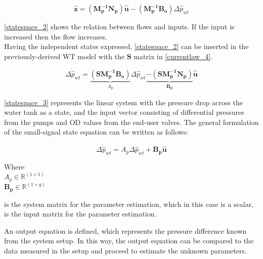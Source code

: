 \begin{equation}
 \bm{\hat{z}} = (\bm{M_p^{-1}}\bm{N_p})\bm{\hat{u}} - (\bm{M_p^{-1}}\bm{B_o})\Delta \hat{p}_{wt}    
 \label{statespace_2}
\end{equation}

\eqref{statespace_2} shows the relation between flows and inputs. If the input is increased then the flow increases. 
\\
Having the independent states expressed, \eqref{statespace_2} can be inserted in the previously-derived WT model with the $\bm{S}$ matrix in \eqref{currentlaw_4}. 

\begin{equation}
\Delta \dot{\hat{p}}_{wt} =  \underbrace{(\bm{S}\bm{M_p^{-1}}\bm{B_o})}_\text{$A_p$} \Delta \hat{p}_{wt}   \underbrace{-(\bm{S}\bm{M_p^{-1}}\bm{N_p})}_\text{$\bm{B_p}$} \bm{\hat{u}} 
\label{statespace_3}
\end{equation}

\eqref{statespace_3} represents the linear system with the pressure drop across the water tank as a state, and the input vector consisting of differential pressures from the pumps and OD values from the end-user valves. The general formulation of the small-signal state equation can be written as follows:  

\begin{equation}
\Delta \dot{\hat{p}}_{wt} =  A_p \Delta \hat{p}_{wt}  + \bm{B_p}\bm{\hat{u}}  
 \label{statespace_4}
\end{equation}

\begin{minipage}[t]{0.24\textwidth}
Where\\
\hspace*{8mm} $A_p \in \mathbb{R}^{(1 \times 1)} $ \\
\newline
\hspace*{8mm} $\bm{B_p} \in \bm{\mathbb{R}}^{(1 \times g)} $ 
\end{minipage}
\begin{minipage}[t]{0.74\textwidth}
\vspace*{2mm}
is the system matrix for the parameter estimation, which in this case is a scalar, \\
is the input matrix for the parameter estimation.
\end{minipage} 

An output equation is defined, which represents the pressure difference known from the system setup. In this way, the output equation can be compared 
to the data measured in the setup and proceed to estimate the unknown parameters. 


